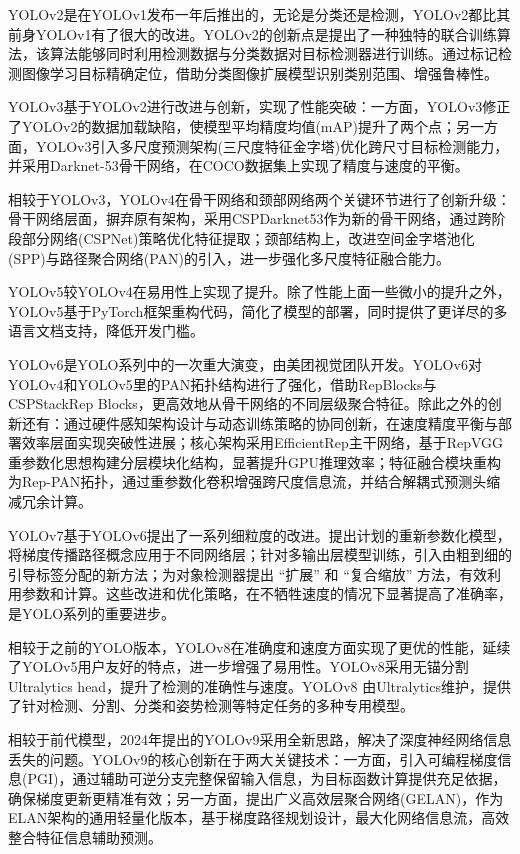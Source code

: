 YOLOv2是在YOLOv1发布一年后推出的\cite{yolov2}，无论是分类还是检测，YOLOv2都比其前身YOLOv1有了很大的改进。YOLOv2的创新点是提出了一种独特的联合训练算法，该算法能够同时利用检测数据与分类数据对目标检测器进行训练。通过标记检测图像学习目标精确定位，借助分类图像扩展模型识别类别范围、增强鲁棒性。

YOLOv3\cite{yolov3}基于YOLOv2进行改进与创新，实现了性能突破：一方面，YOLOv3修正了YOLOv2的数据加载缺陷，使模型平均精度均值(mAP)提升了两个点；另一方面，YOLOv3引入多尺度预测架构(三尺度特征金字塔)优化跨尺寸目标检测能力，并采用Darknet-53骨干网络，在COCO数据集上实现了精度与速度的平衡。

相较于YOLOv3，YOLOv4\cite{yolov4}在骨干网络和颈部网络两个关键环节进行了创新升级：骨干网络层面，摒弃原有架构，采用CSPDarknet53作为新的骨干网络，通过跨阶段部分网络(CSPNet)策略优化特征提取；颈部结构上，改进空间金字塔池化(SPP)与路径聚合网络(PAN)的引入，进一步强化多尺度特征融合能力。

YOLOv5较YOLOv4在易用性上实现了提升。除了性能上面一些微小的提升之外，YOLOv5基于PyTorch框架重构代码，简化了模型的部署，同时提供了更详尽的多语言文档支持，降低开发门槛。

YOLOv6是YOLO系列中的一次重大演变，由美团视觉团队开发\cite{yolov6}。YOLOv6对YOLOv4和YOLOv5里的PAN拓扑结构进行了强化，借助RepBlocks与CSPStackRep Blocks，更高效地从骨干网络的不同层级聚合特征。除此之外的创新还有：通过硬件感知架构设计与动态训练策略的协同创新，在速度精度平衡与部署效率层面实现突破性进展；核心架构采用EfficientRep主干网络，基于RepVGG重参数化思想构建分层模块化结构，显著提升GPU推理效率；特征融合模块重构为Rep-PAN拓扑，通过重参数化卷积增强跨尺度信息流，并结合解耦式预测头缩减冗余计算。

YOLOv7基于YOLOv6提出了一系列细粒度的改进\cite{yolov7}。提出计划的重新参数化模型，将梯度传播路径概念应用于不同网络层；针对多输出层模型训练，引入由粗到细的引导标签分配的新方法；为对象检测器提出 “扩展” 和 “复合缩放” 方法，有效利用参数和计算。这些改进和优化策略，在不牺牲速度的情况下显著提高了准确率，是YOLO系列的重要进步。

相较于之前的YOLO版本，YOLOv8在准确度和速度方面实现了更优的性能，延续了YOLOv5用户友好的特点，进一步增强了易用性。YOLOv8采用无锚分割Ultralytics head，提升了检测的准确性与速度。YOLOv8 由Ultralytics维护，提供了针对检测、分割、分类和姿势检测等特定任务的多种专用模型。

相较于前代模型，2024年提出的YOLOv9采用全新思路，解决了深度神经网络信息丢失的问题\cite{yolov9}。YOLOv9的核心创新在于两大关键技术：一方面，引入可编程梯度信息(PGI)，通过辅助可逆分支完整保留输入信息，为目标函数计算提供充足依据，确保梯度更新更精准有效；另一方面，提出广义高效层聚合网络(GELAN)，作为ELAN架构的通用轻量化版本，基于梯度路径规划设计，最大化网络信息流，高效整合特征信息辅助预测。

